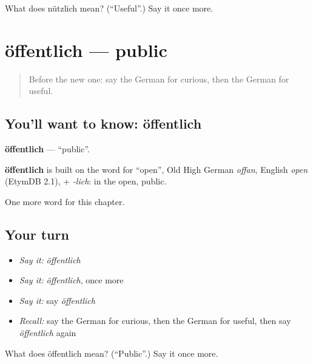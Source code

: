 \begin{tcolorbox}[breakable,colback=teal!4,colframe=teal!35!black,title={Before you move on}]
What does nützlich mean? (\textquotedblleft{}Useful\textquotedblright{}.) Say it once more.
\end{tcolorbox}
\section[öffentlich]{öffentlich — public}

\label{lesson:GE-C219-oeffentlich}



\begin{quote}
Before the new one: say the German for curious, then the German for useful.
\end{quote}

\subsection*{You'll want to know: öffentlich}
\textbf{öffentlich} — \textquotedblleft{}public\textquotedblright{}.

\begin{cousinweb}
\textbf{öffentlich} is built on the word for \textquotedblleft{}open\textquotedblright{}, Old High German \emph{offan}, English \emph{open} (EtymDB 2.1), + \emph{-lich}: in the open, public.
\end{cousinweb}

\begin{grammarlens}[title={What you've built}]
One more word for this chapter.
\end{grammarlens}

\subsection*{Your turn}
\begin{itemize}
\raggedright
  \item \emph{Say it:} \emph{öffentlich}
  \item \emph{Say it:} \emph{öffentlich}, once more
  \item \emph{Say it:} say \emph{öffentlich}
  \item \emph{Recall:} say the German for curious, then the German for useful, then say \emph{öffentlich} again
\end{itemize}

\begin{tcolorbox}[breakable,colback=teal!4,colframe=teal!35!black,title={Before you move on}]
What does öffentlich mean? (\textquotedblleft{}Public\textquotedblright{}.) Say it once more.
\end{tcolorbox}
